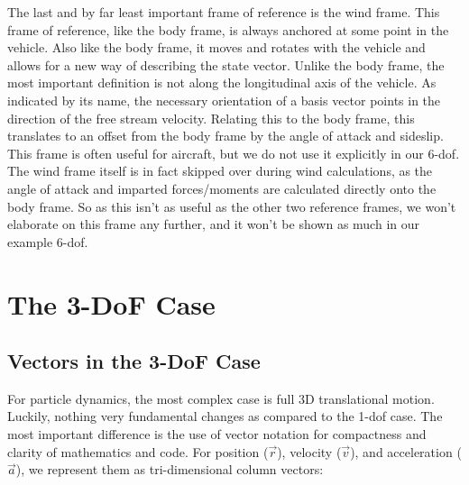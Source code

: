 \documentclass[12pt]{report}
\begin{document}
The last and by far least important frame of reference is the \gls{wind frame}. This frame of reference, like the body frame, is always anchored at some point in the vehicle. Also like the body frame, it moves and rotates with the vehicle and allows for a new way of describing the \gls{state vector}. Unlike the body frame, the most important definition is not along the longitudinal axis of the vehicle. As indicated by its name, the necessary orientation of a basis vector points in the direction of the free stream velocity. Relating this to the body frame, this translates to an offset from the body frame by the \gls{angle of attack} and sideslip. This frame is often useful for aircraft, but we do not use it explicitly in our 6-\gls{dof}. The wind frame itself is in fact skipped over during wind calculations, as the \gls{angle of attack} and imparted forces/moments are calculated directly onto the body frame. So as this isn’t as useful as the other two reference frames, we won’t elaborate on this frame any further, and it won’t be shown as much in our example 6-\gls{dof}.

\section{The 3-DoF Case}\label{sec: 3DoF Case}
\subsection{Vectors in the 3-DoF Case}
For particle dynamics, the most complex case is full 3D translational motion. Luckily, nothing very fundamental changes as compared to the 1-\gls{dof} case. The most important difference is the use of vector notation for compactness and clarity of mathematics and code. For position ($\vec{r}$), velocity ($\vec {v}$), and acceleration ($\vec{a}$), we represent them as tri-dimensional column vectors:
\end{document}
